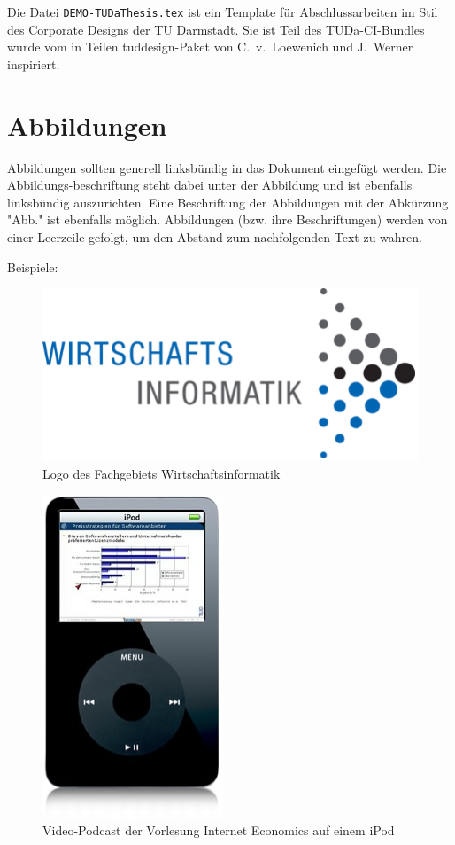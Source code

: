 \documentclass[
	english,
	ruledheaders=section,%
	class=report,%
	thesis={type=bachelor},%
	accentcolor=1b,%
	custommargins=true,%
	marginpar=false,%
	parskip=half-,%
	fontsize=11pt,%
	DIV=14,
]{tudapub}
\let\file\texttt
\begin{document}
Die Datei \file{DEMO-TUDaThesis.tex} ist ein Template für Abschlussarbeiten im Stil des Corporate Designs der TU Darmstadt.
Sie ist Teil des TUDa-CI-Bundles wurde vom in Teilen tuddesign-Paket von C.~v.~Loewenich und J.~Werner inspiriert.

 \section{Abbildungen}
Abbildungen sollten generell linksbündig in das Dokument eingefügt werden. Die Abbildungs-beschriftung steht dabei unter der Abbildung und ist ebenfalls linksbündig auszurichten. Eine Beschriftung der Abbildungen mit der Abkürzung "Abb." ist ebenfalls möglich. Abbildungen (bzw. ihre Beschriftungen) werden von einer Leerzeile gefolgt, um den Abstand zum nachfolgenden Text zu wahren.

Beispiele:

 
\begin{figure}[ht]
     \centering
     \includegraphics[]{images/Picture 1.png}
     \caption{Logo des Fachgebiets Wirtschaftsinformatik}
     \label{fig:logo}
\end{figure}

\begin{figure}[ht]
     \centering
     \includegraphics[]{images/Picture 1.jpg}
     \caption{Video-Podcast der Vorlesung Internet Economics auf einem iPod}
     \label{fig:logo2}
\end{figure}
\end{document}
